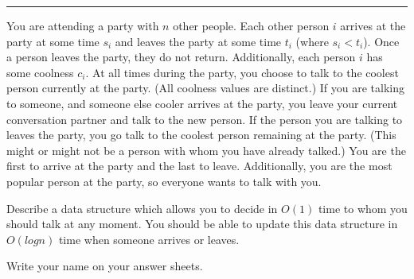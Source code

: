 \documentclass[12pt]{exam}
\newcommand{\seperate}{\begin{center}\noindent\rule{18cm}{0.75pt}\end{center}}
\begin{document}
\begin{questions}

    \seperate

    \question[20] You are attending a party with $n$ other people. Each other person $i$ arrives at the party at some time
    $s_i$ and leaves the party at some time $t_i$ (where $s_i < t_i$). Once a person leaves the party, they do not return.
    Additionally, each person $i$ has some coolness $c_i$. At all times during the party, you choose to talk to the coolest person currently at the party. (All coolness values are distinct.) If you are talking to someone, and someone else cooler arrives at the party, you leave your current conversation partner and talk to the new person. If the person you are talking to leaves the party, you go talk to the coolest person remaining at the party. (This might or might not be a person with whom you have already talked.) You are the first to arrive at the party and the last to leave. Additionally, you are the most popular
    person at the party, so everyone wants to talk with you.

    Describe a data structure which allows you to decide in $O(1)$ time to whom you should talk at any moment. You should be able to update this data structure in $O(log n)$ time when someone arrives or leaves.

    \question[5]Write your name on your answer sheets.

\end{questions}
\end{document}
